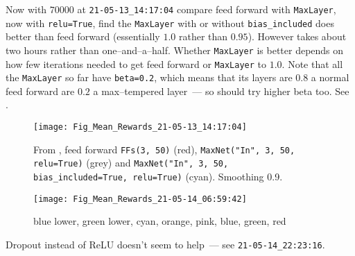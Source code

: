 \documentclass[12pt]{article}
\begin{document}
Now with $\num{70000}$ at \verb|21-05-13_14:17:04| compare feed forward with \verb|MaxLayer|, now with \verb|relu=True|, find the \verb|MaxLayer| with or without \verb|bias_included| does better than feed forward (essentially $1.0$ rather than $0.95$).  However takes about two hours rather than one--and--a--half.  Whether \verb|MaxLayer| is better depends on how few iterations needed to get feed forward or \verb|MaxLayer| to $1.0$.  Note that all the \verb|MaxLayer| so far have \verb|beta=0.2|, which means that its layers are $0.8$ a normal feed forward are $0.2$ a max--tempered layer~--- so should try higher beta too.  See .
\begin{figure}
	\centering
	\texttt{[image: Fig\_Mean\_Rewards\_21-05-13\_14:17:04]}
	\caption{From , feed forward \texttt{FFs(3, 50)} (red), \texttt{MaxNet("In", 3, 50, relu=True)} (grey) and \texttt{MaxNet("In", 3, 50, bias\_included=True, relu=True)} (cyan).  Smoothing 0.9.}
	\label{fig:figmeanrewards21-05-13141704}
\end{figure}
\begin{figure}
	\centering
	\texttt{[image: Fig\_Mean\_Rewards\_21-05-14\_06:59:42]}
	\caption{blue lower, green lower, cyan, orange, pink, blue, green, red}
	\label{fig:figmeanrewards21-05-14065942}
\end{figure}

Dropout instead of ReLU doesn't seem to help~--- see \verb|21-05-14_22:23:16|.
\end{document}
